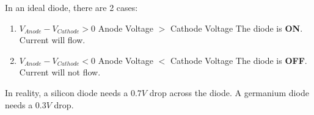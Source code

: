 \documentclass[10pt,letterpaper,twoside,notitlepage]{article}
\begin{document}
	In an ideal diode, there are 2 cases:
	\begin{enumerate}
		\item $V_{Anode}-V_{Cathode}>0$ Anode Voltage $>$ Cathode Voltage \newline
			The diode is \textbf{ON}. Current will flow.
		\item $V_{Anode}-V_{Cathode}<0$ Anode Voltage $<$ Cathode Voltage \newline
			The diode is \textbf{OFF}. Current will not flow.
	\end{enumerate}
	
	In reality, a silicon diode needs a $0.7V$ drop across the diode. A germanium diode needs a $0.3V$ drop. 
\end{document}
